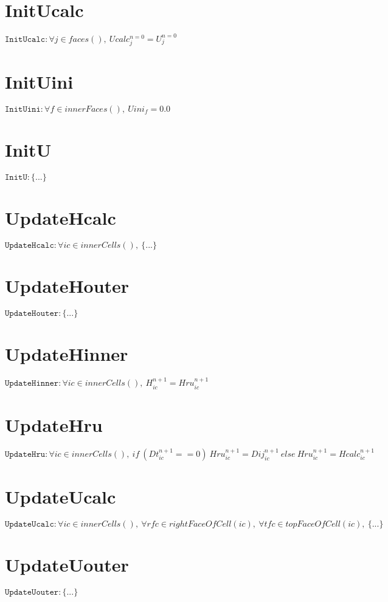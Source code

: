 \documentclass[11pt]{article}
\begin{document}
\section{InitUcalc}
$\texttt{InitUcalc} : \forall{j\in faces()}, \ Ucalc^{n=0}_{j} = U^{n=0}_{j}$


\section{InitUini}
$\texttt{InitUini} : \forall{f\in innerFaces()}, \ Uini_{f} = 0.0$


\section{InitU}
$\texttt{InitU} : \{ ... \}$


\section{UpdateHcalc}
$\texttt{UpdateHcalc} : \forall{ic\in innerCells()}, \ \{ ... \}$


\section{UpdateHouter}
$\texttt{UpdateHouter} : \{ ... \}$


\section{UpdateHinner}
$\texttt{UpdateHinner} : \forall{ic\in innerCells()}, \ H^{n+1}_{ic} = Hru^{n+1}_{ic}$


\section{UpdateHru}
$\texttt{UpdateHru} : \forall{ic\in innerCells()}, \ if~\left(Dt^{n+1}_{ic} == 0\right)~Hru^{n+1}_{ic} = Dij^{n+1}_{ic}~else~Hru^{n+1}_{ic} = Hcalc^{n+1}_{ic}$


\section{UpdateUcalc}
$\texttt{UpdateUcalc} : \forall{ic\in innerCells()}, \ \forall{rfc\in rightFaceOfCell(ic)}, \ \forall{tfc\in topFaceOfCell(ic)}, \ \{ ... \}$


\section{UpdateUouter}
$\texttt{UpdateUouter} : \{ ... \}$
\end{document}
